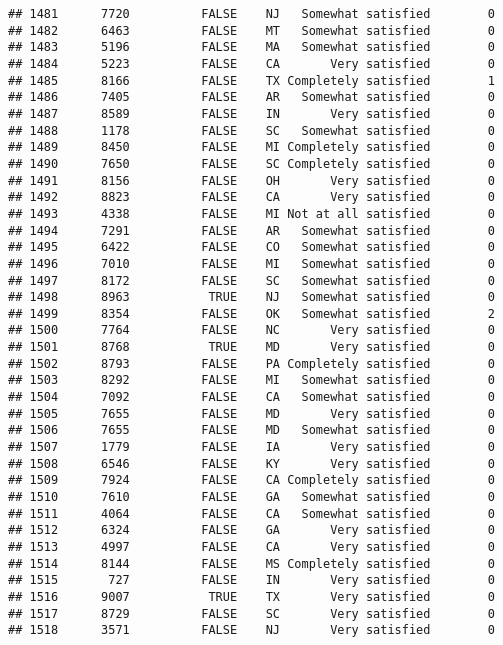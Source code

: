 \documentclass[]{book}
\theoremstyle{definition}
\theoremstyle{definition}
\theoremstyle{remark}
\begin{document}
\begin{verbatim}
## 1481      7720          FALSE    NJ   Somewhat satisfied        0
## 1482      6463          FALSE    MT   Somewhat satisfied        0
## 1483      5196          FALSE    MA   Somewhat satisfied        0
## 1484      5223          FALSE    CA       Very satisfied        0
## 1485      8166          FALSE    TX Completely satisfied        1
## 1486      7405          FALSE    AR   Somewhat satisfied        0
## 1487      8589          FALSE    IN       Very satisfied        0
## 1488      1178          FALSE    SC   Somewhat satisfied        0
## 1489      8450          FALSE    MI Completely satisfied        0
## 1490      7650          FALSE    SC Completely satisfied        0
## 1491      8156          FALSE    OH       Very satisfied        0
## 1492      8823          FALSE    CA       Very satisfied        0
## 1493      4338          FALSE    MI Not at all satisfied        0
## 1494      7291          FALSE    AR   Somewhat satisfied        0
## 1495      6422          FALSE    CO   Somewhat satisfied        0
## 1496      7010          FALSE    MI   Somewhat satisfied        0
## 1497      8172          FALSE    SC   Somewhat satisfied        0
## 1498      8963           TRUE    NJ   Somewhat satisfied        0
## 1499      8354          FALSE    OK   Somewhat satisfied        2
## 1500      7764          FALSE    NC       Very satisfied        0
## 1501      8768           TRUE    MD       Very satisfied        0
## 1502      8793          FALSE    PA Completely satisfied        0
## 1503      8292          FALSE    MI   Somewhat satisfied        0
## 1504      7092          FALSE    CA   Somewhat satisfied        0
## 1505      7655          FALSE    MD       Very satisfied        0
## 1506      7655          FALSE    MD   Somewhat satisfied        0
## 1507      1779          FALSE    IA       Very satisfied        0
## 1508      6546          FALSE    KY       Very satisfied        0
## 1509      7924          FALSE    CA Completely satisfied        0
## 1510      7610          FALSE    GA   Somewhat satisfied        0
## 1511      4064          FALSE    CA   Somewhat satisfied        0
## 1512      6324          FALSE    GA       Very satisfied        0
## 1513      4997          FALSE    CA       Very satisfied        0
## 1514      8144          FALSE    MS Completely satisfied        0
## 1515       727          FALSE    IN       Very satisfied        0
## 1516      9007           TRUE    TX       Very satisfied        0
## 1517      8729          FALSE    SC       Very satisfied        0
## 1518      3571          FALSE    NJ       Very satisfied        0

\end{verbatim}
\end{document}
